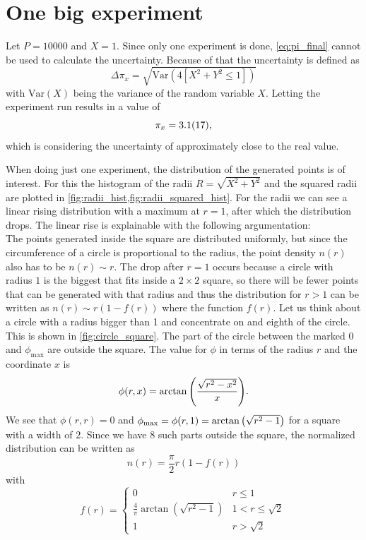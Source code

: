 \section{One big experiment}\label{sec:1}
Let $P = \num{10000}$ and $X = 1$. Since only one experiment is done,
\cref{eq:pi_final} cannot be used to calculate the uncertainty. Because of that
the uncertainty is defined as
\begin{equation}
	\Delta \pi_x = \sqrt{\text{Var}(4[X^2 + Y^2 \leq 1])}
    \label{eq:uncertainty_for_one_x}
\end{equation}
with $\text{Var}(X)$ being the variance of the random variable $X$.
Letting the experiment run results in a value of
\begin{equation}
	\pi_x = \num{3.1 \pm 1.7},
\end{equation}
which is considering the uncertainty of approximately  close to the real value.\par
%
When doing just one experiment, the distribution of the generated points is 
of interest. For this the histogram of the radii $R = \sqrt{X^2 + Y^2}$
and the squared radii are plotted in \cref{fig:radii_hist,fig:radii_squared_hist}.
For the radii we can see a linear rising distribution with a maximum at $r=1$, after which 
the distribution drops. 
The linear rise is explainable with the following argumentation:\\
The points generated inside the square are distributed uniformly, but since 
the circumference of a circle is proportional to the radius, the point density $n(r)$
also has to be $n(r)  \sim  r$. The drop after $r = 1$ occurs because 
a circle with radius $1$ is the biggest that fits inside a $2\times 2$ 
square, so there will be fewer points that can be generated with that radius and thus 
the distribution for $r > 1$ can be written as $n(r) \sim r(1-f(r))$ where 
the function $f(r)$. 
Let us think about a circle with a radius bigger than 1 and concentrate on 
and eighth of the circle. This is shown in \cref{fig:circle_square}. 
The part of the circle between the marked 0 and $\phi_\text{max}$
are outside the square. The value for $\phi$ in terms of the radius $r$ and the coordinate 
$x$ is 
\[
    \phi(r, x) = \arctan\qty(\frac{\sqrt{r^2 - x^2}}{x}).
\]
We see that $\phi(r, r) = 0$ and $\phi_\text{max} = \phi(r, 1) = \arctan\qty(\sqrt{r^2 - 1})$
for a square with a width of $2$. 
Since we have 8 such parts outside the square, the normalized distribution can be 
written as 
\[
    n(r) = \frac \pi 2 r (1 - f(r))
\]
with 
\[
    f(r) = \begin{cases}
        0 & r \leq 1 \\
        \frac 4\pi \arctan(\sqrt{r^2 - 1}) & 1 < r \leq \sqrt{2} \\ 
        1 & r > \sqrt 2
    \end{cases}
\]

